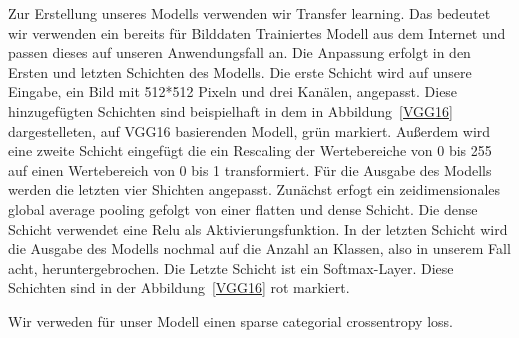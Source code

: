 \documentclass{article}
\begin{document}
Zur Erstellung unseres Modells verwenden wir Transfer learning. Das bedeutet wir verwenden ein bereits für Bilddaten Trainiertes Modell aus dem Internet und passen dieses auf unseren Anwendungsfall an. Die Anpassung erfolgt in den Ersten und letzten Schichten des Modells. Die erste Schicht wird auf unsere Eingabe, ein Bild mit 512*512 Pixeln und drei Kanälen, angepasst. Diese hinzugefügten Schichten sind beispielhaft in dem in Abbildung~\ref{VGG16} dargestelleten, auf VGG16 basierenden Modell, grün markiert. Au\ss erdem wird eine zweite Schicht eingefügt die ein Rescaling der Wertebereiche von 0 bis 255 auf einen Wertebereich von 0 bis 1 transformiert. Für die Ausgabe des Modells werden die letzten vier Shichten angepasst. Zunächst erfogt ein zeidimensionales global average pooling gefolgt von einer flatten und dense Schicht. Die dense Schicht verwendet eine Relu als Aktivierungsfunktion. In der letzten Schicht wird die Ausgabe des Modells nochmal auf die Anzahl an Klassen, also in unserem Fall acht, heruntergebrochen. Die Letzte Schicht ist ein Softmax-Layer. Diese Schichten sind in der Abbildung~\ref{VGG16} rot markiert.

Wir verweden für unser Modell einen sparse categorial crossentropy loss.
\end{document}
